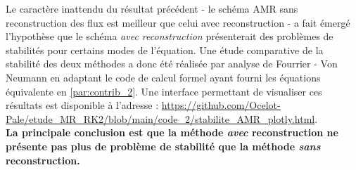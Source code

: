 \label{par:stab_amr}
Le caractère inattendu du résultat précédent - le schéma AMR sans reconstruction des flux est meilleur que celui avec reconstruction - a fait émergé l'hypothèse 
que le schéma \textit{avec reconstruction} présenterait des problèmes de stabilités pour certains modes de l'équation.
Une étude comparative de la stabilité des deux méthodes a donc été réalisée par analyse de Fourrier - Von Neumann en adaptant le code de calcul formel ayant fourni les équations équivalente en \ref{par:contrib_2}.
Une interface permettant de visualiser ces résultats est disponible à l'adresse : \href{https://github.com/Ocelot-Pale/etude\_MR\_RK2/blob/main/code\_2/stabilite\_AMR\_plotly.html}{https://github.com/Ocelot-Pale/etude\_MR\_RK2/blob/main/code\_2/stabilite\_AMR\_plotly.html}.\\
\textbf{La principale conclusion est que la méthode \textit{avec} reconstruction ne présente pas plus de problème de stabilité que la méthode \textit{sans} reconstruction.}
